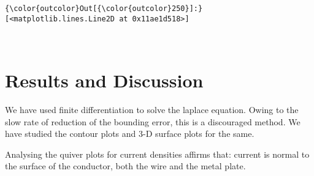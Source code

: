 \documentclass[11pt]{article}
\begin{document}
\begin{Verbatim}[commandchars=\\\{\}]
{\color{outcolor}Out[{\color{outcolor}250}]:} [<matplotlib.lines.Line2D at 0x11ae1d518>]
\end{Verbatim}
            
    \begin{center}
    \end{center}
    { \hspace*{\fill} \\}
    
    \hypertarget{results-and-discussion}{%
\section{Results and Discussion}\label{results-and-discussion}}

We have used finite differentiation to solve the laplace equation. Owing
to the slow rate of reduction of the bounding error, this is a
discouraged method. We have studied the contour plots and 3-D surface
plots for the same.

Analysing the quiver plots for current densities affirms that: current
is normal to the surface of the conductor, both the wire and the metal
plate.


    
    
    
    
\end{document}

